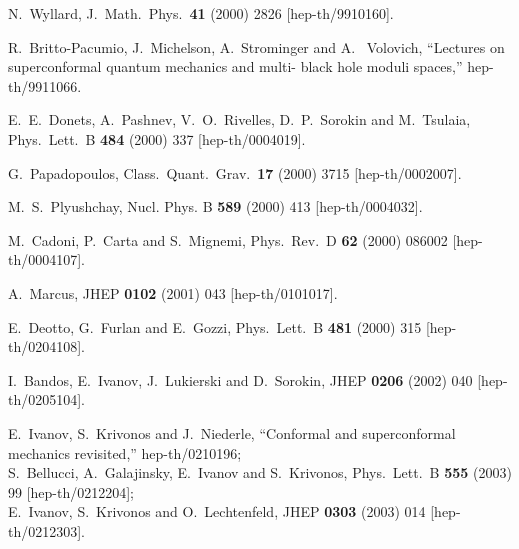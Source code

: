 \documentclass[a4paper,12pt]{article}
\begin{document}
\begin{thebibliography}{99}
N.~Wyllard,
J.\ Math.\ Phys.\  {\bf 41} (2000) 2826
[hep-th/9910160].


R.~Britto-Pacumio, J.~Michelson, A.~Strominger and A.~
Volovich,
``Lectures on superconformal quantum mechanics and multi-
black hole  moduli spaces,''
hep-th/9911066.


E.~E.~Donets, A.~Pashnev, V.~O.~Rivelles, D.~P.~Sorokin and
M.~Tsulaia,
Phys.\ Lett.\ B {\bf 484} (2000) 337
[hep-th/0004019].


G.~Papadopoulos,
Class.\ Quant.\ Grav.\  {\bf 17} (2000) 3715
[hep-th/0002007].


M.~S.~Plyushchay,
Nucl. Phys. B {\bf 589} (2000) 413
[hep-th/0004032].


M.~Cadoni, P.~Carta and S.~Mignemi,
Phys.\ Rev.\ D {\bf 62} (2000) 086002
[hep-th/0004107].



A.~Marcus,
JHEP {\bf 0102} (2001) 043
[hep-th/0101017].


E.~Deotto, G.~Furlan and E.~Gozzi,
Phys.\ Lett.\ B {\bf 481} (2000) 315
[hep-th/0204108].

I.~Bandos, E.~Ivanov, J.~Lukierski and D.~Sorokin,
JHEP {\bf 0206} (2002) 040
[hep-th/0205104].

E.~Ivanov, S.~Krivonos and J.~Niederle,
``Conformal and superconformal mechanics revisited,''
hep-th/0210196;\\
S.~Bellucci, A.~Galajinsky, E.~Ivanov and S.~Krivonos,
Phys.\ Lett.\ B {\bf 555} (2003) 99
[hep-th/0212204];\\
E.~Ivanov, S.~Krivonos and O.~Lechtenfeld,
JHEP {\bf 0303} (2003) 014
[hep-th/0212303].



\end{thebibliography}
\end{document}
